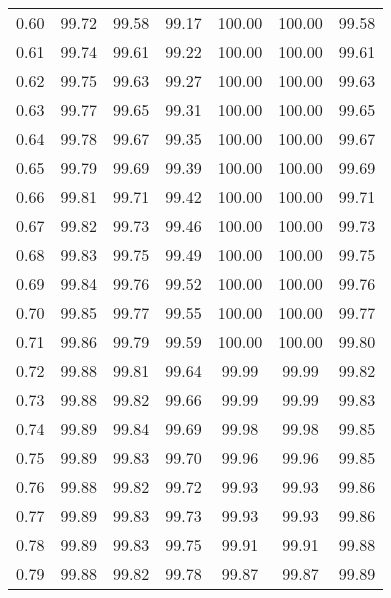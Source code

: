 \begin{tabular}{|c|c|c|c|c|c|c|}
      0.60 &     99.72 &     99.58 &      99.17 &  100.00 &     100.00 &         99.58 \\
      0.61 &     99.74 &     99.61 &      99.22 &  100.00 &     100.00 &         99.61 \\
      0.62 &     99.75 &     99.63 &      99.27 &  100.00 &     100.00 &         99.63 \\
      0.63 &     99.77 &     99.65 &      99.31 &  100.00 &     100.00 &         99.65 \\
      0.64 &     99.78 &     99.67 &      99.35 &  100.00 &     100.00 &         99.67 \\
      0.65 &     99.79 &     99.69 &      99.39 &  100.00 &     100.00 &         99.69 \\
      0.66 &     99.81 &     99.71 &      99.42 &  100.00 &     100.00 &         99.71 \\
      0.67 &     99.82 &     99.73 &      99.46 &  100.00 &     100.00 &         99.73 \\
      0.68 &     99.83 &     99.75 &      99.49 &  100.00 &     100.00 &         99.75 \\
      0.69 &     99.84 &     99.76 &      99.52 &  100.00 &     100.00 &         99.76 \\
      0.70 &     99.85 &     99.77 &      99.55 &  100.00 &     100.00 &         99.77 \\
      0.71 &     99.86 &     99.79 &      99.59 &  100.00 &     100.00 &         99.80 \\
      0.72 &     99.88 &     99.81 &      99.64 &   99.99 &      99.99 &         99.82 \\
      0.73 &     99.88 &     99.82 &      99.66 &   99.99 &      99.99 &         99.83 \\
      0.74 &     99.89 &     99.84 &      99.69 &   99.98 &      99.98 &         99.85 \\
      0.75 &     99.89 &     99.83 &      99.70 &   99.96 &      99.96 &         99.85 \\
      0.76 &     99.88 &     99.82 &      99.72 &   99.93 &      99.93 &         99.86 \\
      0.77 &     99.89 &     99.83 &      99.73 &   99.93 &      99.93 &         99.86 \\
      0.78 &     99.89 &     99.83 &      99.75 &   99.91 &      99.91 &         99.88 \\
      0.79 &     99.88 &     99.82 &      99.78 &   99.87 &      99.87 &         99.89 \\

\end{tabular}
